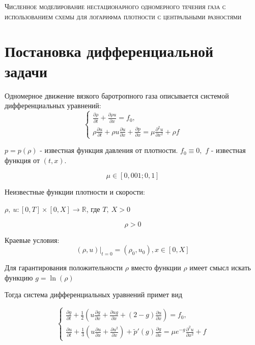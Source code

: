 \documentclass[a4paper, 11pt]{article}
\begin{document}
\begin{center}

\textsc{Численное моделирование нестационарного 
    одномерного течения газа с использованием схемы 
    для логарифма плотности с центральными разностями}

\end{center}

\enlargethispage{9\baselineskip}

\section{Постановка дифференциальной задачи}
Одномерное движение вязкого баротропного газа описывается системой дифференциальных уравнений:
$$
\begin{cases} 
\displaystyle{\frac{\partial \rho}{\partial t} +
 \frac{\partial \rho u}{\partial x} = f_0}, \\

\displaystyle{\rho \frac{\partial u}{\partial t} +
 \rho u \frac{\partial u}{\partial x}+ 
 \frac{\partial p}{\partial x} = 
\mu \frac{\partial^2 u}{\partial x^2}
+ \rho f}
\end{cases}
$$

\begin{center}
$
p = p (\rho)
$ - известная функция давления от плотности. 
$f_0 \equiv 0, $
$f$ - известная функция от $(t, x)$.
\end{center}
$$\mu \in [0,001; 0,1]$$

Неизвестные функции плотности и скорости:

\begin{center}
$\rho,\ u: [0, T] \times [0, X] \rightarrow \mathbb{R}$, где $T,\ X > 0$
\end{center}

$$\rho > 0$$

Краевые условия:
$$(\rho, u)|_{t=0} = (\rho_0, u_0), x \in [0, X]$$

Для гарантирования положительности $\rho$ вместо функции $\rho$ имеет смысл искать функцию $g = \ln(\rho)$ 

Тогда система дифференциальных уравнений примет вид

$$
\begin{cases}
\displaystyle{\frac{\partial g}{\partial t} + \frac{1}{2} \left(u\frac{\partial g}{\partial x} +     \frac{\partial ug}{\partial x} +(2-g)\frac{\partial u}{\partial x}\right) = f_0},\\
\displaystyle{\frac{\partial u}
{\partial t} + \frac{1}{3} \left(u 
\frac{\partial u}{\partial x} +
 \frac{\partial u^2}{\partial x}\right) +
  \tilde{p}'(g)
 \frac{\partial g}{\partial x} = \mu
  e^{-g}\frac{\partial^2 u}{\partial x^2} +
   f}
\end{cases}
$$
\end{document}
